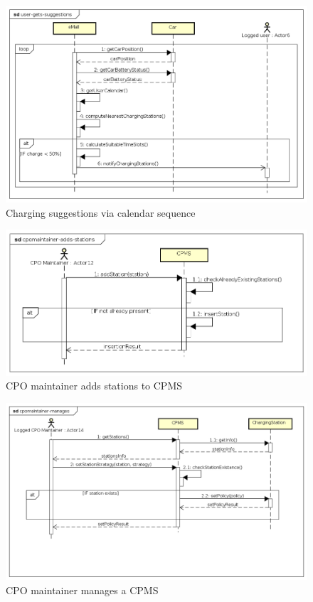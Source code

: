 \begin{figure}[!h]
    \begin{center}
        \includegraphics[keepaspectratio, width=16cm]{Sequence/user-gets-suggestions.png}
        \caption{Charging suggestions via calendar sequence}
    \end{center}
\end{figure}
\begin{figure}[!h]
    \begin{center}
        \includegraphics[keepaspectratio, width=16cm]{Sequence/cpomaintainer-adds-stations.png}
        \caption{\ac{CPO} maintainer adds stations to \ac{CPMS}}
    \end{center}
\end{figure}
\begin{figure}[!h]
    \begin{center}
        \includegraphics[keepaspectratio, width=16cm]{Sequence/cpomaintainer-manages.png}
        \caption{\ac{CPO} maintainer manages a \ac{CPMS}}
    \end{center}
\end{figure}

